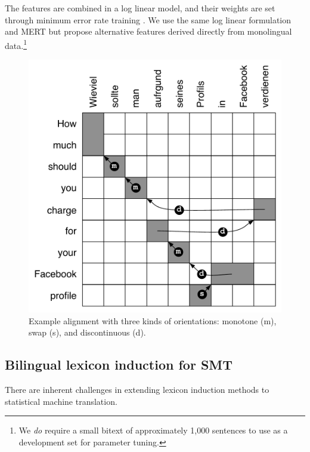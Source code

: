 \documentclass[11pt]{article}
\DeclareMathOperator*{\argmax}{arg\,max}
\begin{document}
\noindent
The features are combined in a log linear model, and their weights are set through minimum error rate training \cite{Och2003c}.
We use the same log linear formulation and MERT but propose alternative features derived directly from monolingual data.\footnote{We \emph{do} require a small bitext of approximately 1,000 sentences to use as a development set for parameter tuning.}
\begin{figure}[t]
\vskip 0.1in
\begin{center}
\includegraphics[width=0.8 \linewidth]{../figures/reorderfeats/reorderfeats.pdf}
\caption{Example alignment with three kinds of orientations: monotone (m), swap (s), and discontinuous (d). }
\label{fig:reorderfeats} 
\end{center}
\end{figure}

\subsection{Bilingual lexicon induction for SMT} \label{sect:bckg:lexind}
 
There are inherent challenges in extending lexicon induction methods to statistical machine translation.  
\end{document}
